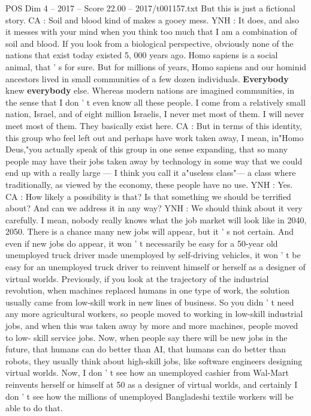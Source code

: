 \begin{textsample}{POS Dim 4 – 2017 – Score 22.00 – 2017/t001157.txt}
But this is just a fictional story.
CA : Soil and blood kind of makes a gooey mess.
YNH : It does, and also it messes with your mind when you think too much that I am a combination of soil and blood.
If you look from a biological perspective, obviously none of the nations that exist today existed 5, 000 years ago.
Homo sapiens is a social animal, that ' s for sure.
But for millions of years, Homo sapiens and our hominid ancestors lived in small communities of a few dozen individuals. \textbf{Everybody} knew \textbf{everybody} else.
Whereas modern nations are imagined communities, in the sense that I don ' t even know all these people.
I come from a relatively small nation, Israel, and of eight million Israelis, I never met most of them.
I will never meet most of them.
They basically exist here.
CA : But in terms of this identity, this group who feel left out and perhaps have work taken away, I mean, in"Homo Deus,"you actually speak of this group in one sense expanding, that so many people may have their jobs taken away by technology in some way that we could end up with a really large — I think you call it a"useless class"— a class where traditionally, as viewed by the economy, these people have no use.
YNH : Yes.
CA : How likely a possibility is that?
Is that something we should be terrified about?
And can we address it in any way?
YNH : We should think about it very carefully.
I mean, nobody really knows what the job market will look like in 2040, 2050.
There is a chance many new jobs will appear, but it ' s not certain.
And even if new jobs do appear, it won ' t necessarily be easy for a 50-year old unemployed truck driver made unemployed by self-driving vehicles, it won ' t be easy for an unemployed truck driver to reinvent himself or herself as a designer of virtual worlds.
Previously, if you look at the trajectory of the industrial revolution, when machines replaced humans in one type of work, the solution usually came from low-skill work in new lines of business.
So you didn ' t need any more agricultural workers, so people moved to working in low-skill industrial jobs, and when this was taken away by more and more machines, people moved to low- skill service jobs.
Now, when people say there will be new jobs in the future, that humans can do better than AI, that humans can do better than robots, they usually think about high-skill jobs, like software engineers designing virtual worlds.
Now, I don ' t see how an unemployed cashier from Wal-Mart reinvents herself or himself at 50 as a designer of virtual worlds, and certainly I don ' t see how the millions of unemployed Bangladeshi textile workers will be able to do that.

\end{textsample}
